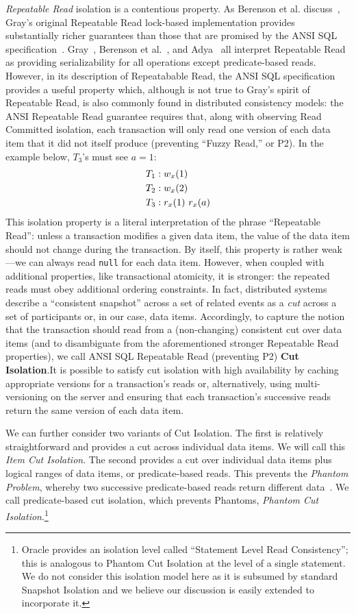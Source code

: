 \textit{Repeatable Read} isolation is a contentious property. As
Berenson et al. discuss~\cite{ansicritique}, Gray's original
Repeatable Read lock-based implementation provides substantially
richer guarantees than those that are promised by the ANSI SQL
specification~\cite{gray-isolation}. Gray~\cite{gray-isolation},
Berenson et al.~\cite{ansicritique}, and Adya~\cite{adya} all
interpret Repeatable Read as providing serializability for all
operations except predicate-based reads. However, in its description
of Repeatabable Read, the ANSI SQL specification provides a useful
property which, although is not true to Gray's spirit of Repeatable
Read, is also commonly found in distributed consistency models: the
ANSI Repeatable Read guarantee requires that, along with observing
Read Committed isolation, each transaction will only read one version
of each data item that it did not itself produce (preventing ``Fuzzy
Read,'' or P2). In the example below, $T_3$'s must see $a=1$:
\begin{align*}
\small
T_1 &: w_x(1)
\\T_2 &: w_x(2)
\\T_3 &: r_x(1)~r_x(a)
\end{align*}
This isolation property is a literal interpretation of the phrase
``Repeatable Read'': unless a transaction modifies a given data item,
the value of the data item should not change during the
transaction. By itself, this property is rather weak---we can always
read \texttt{null} for each data item. However, when coupled with
additional properties, like transactional atomicity, it is stronger:
the repeated reads must obey additional ordering constraints. In fact,
distributed systems describe a ``consistent snapshot'' across a set of
related events as a \textit{cut} across a set of participants or, in
our case, data items. Accordingly, to capture the notion that the
transaction should read from a (non-changing) consistent cut over data
items (and to disambiguate from the aforementioned stronger Repeatable
Read properties), we call ANSI SQL Repeatable Read (preventing P2)
\textbf{Cut Isolation}.It is possible to satisfy cut isolation with
high availability by caching appropriate versions for a transaction's
reads or, alternatively, using multi-versioning on the server and
ensuring that each transaction's successive reads return the same
version of each data item.

We can further consider two variants of Cut Isolation. The first is
relatively straightforward and provides a cut across individual data
items. We will call this \textit{Item Cut Isolation}. The second
provides a cut over individual data items plus logical ranges of data
items, or predicate-based reads. This prevents the \textit{Phantom
  Problem}, whereby two successive predicate-based reads return
different data~\cite{gray-isolation}. We call predicate-based cut isolation, which prevents
Phantoms, \textit{Phantom Cut Isolation}.\footnote{Oracle provides an
  isolation level called ``Statement Level Read Consistency''; this is
  analogous to Phantom Cut Isolation at the level of a single
  statement. We do not consider this isolation model here as it is
  subsumed by standard Snapshot Isolation and we believe our
  discussion is easily extended to incorporate it.}

